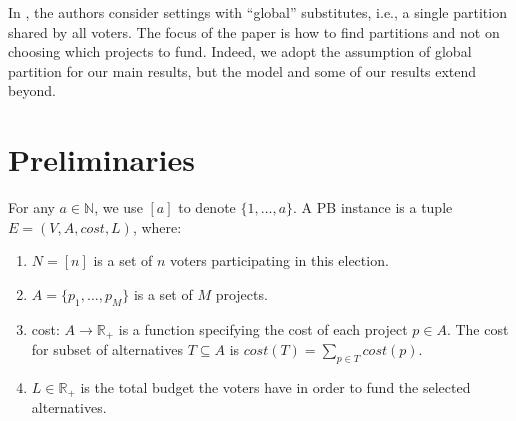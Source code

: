 \documentclass[runningheads]{llncs}
\newcommand{\kibitz}[2]{\ifnum\Comments=1{\color{#1}{#2}}\fi}
\newcommand{\rmr}[1]{\kibitz{red}{[Reshef says:#1]}}
\newcommand{\rf}[1]{\kibitz{blue}{[Roy says:#1]}}
\begin{document}
 In \citep{jain2021partition}, the authors consider settings with  ``global''  substitutes, i.e., a single partition  shared by all voters. The focus of the  paper  is how to find  partitions and not on choosing which projects to fund.
 Indeed, we adopt the assumption of global partition for our main results, but the model and some of our results extend beyond.
 
 



\section{Preliminaries}
For any  $a\in \mathbb{N}$,  we use   $[a]$ to denote $\{1,\ldots,a\}$.
A PB instance is a tuple $E=(V,A,cost,L)$, where:
\begin{enumerate}
    \item $N=[n]$ is a set of $n$ voters participating in this election.
    \item $A=\{p_1,\ldots,p_M\}$ is a set of $M$  projects. 
    \item cost: $A\rightarrow \mathbb{R}_+$ is a function specifying the cost of each project $p\in A$. The cost for subset of alternatives $T\subseteq A$ is $cost(T)=\sum_{p\in T}cost(p)$.
    \item $L\in \mathbb{R}_+$ is the total budget the voters have in order to fund the selected alternatives. 
\end{enumerate}
 
\end{document}

